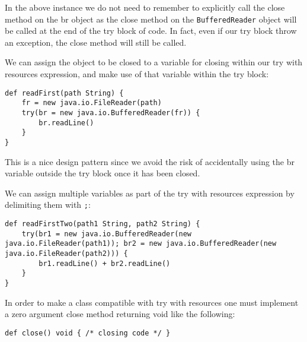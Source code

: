 \documentclass[conc-doc]{subfiles}
\begin{document}
In the above instance we do not need to remember to explicitly call the close method on the br object as the close method on the \lstinline{BufferedReader} object will be called at the end of the try block of code. In fact, even if our try block throw an exception, the close method will still be called.

We can assign the object to be closed to a variable for closing within our try with resources expression, and make use of that variable within the try block:
\begin{lstlisting}
def readFirst(path String) {
	fr = new java.io.FileReader(path)
	try(br = new java.io.BufferedReader(fr)) {
		br.readLine()
	}
}
\end{lstlisting}

This is a nice design pattern since we avoid the risk of accidentally using the br variable outside the try block once it has been closed.

We can assign multiple variables as part of the try with resources expression by delimiting them with \lstinline{;}:
\begin{lstlisting}
def readFirstTwo(path1 String, path2 String) {
	try(br1 = new java.io.BufferedReader(new java.io.FileReader(path1)); br2 = new java.io.BufferedReader(new java.io.FileReader(path2))) {
		br1.readLine() + br2.readLine()
	}
}
\end{lstlisting}

In order to make a class compatible with try with resources one must implement a zero argument close method returning void like the following:
\begin{lstlisting}
def close() void { /* closing code */ }
\end{lstlisting}
\end{document}
